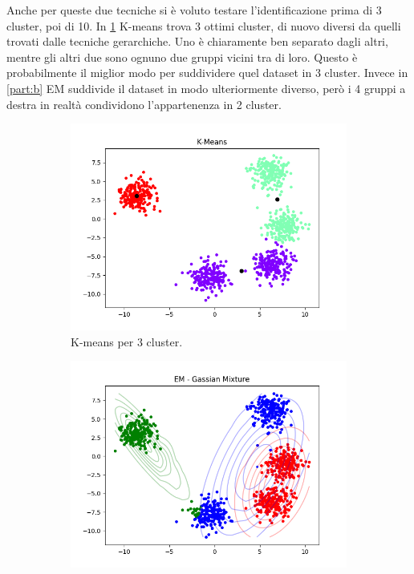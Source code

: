 \documentclass{llncs}
\begin{document}
	Anche per queste due tecniche si è voluto testare l'identificazione prima di 3 cluster, poi di 10. In \ref{part:a} K-means trova 3 ottimi cluster, di nuovo diversi da quelli trovati dalle tecniche gerarchiche.
	Uno è chiaramente ben separato dagli altri, mentre gli altri due sono ognuno due gruppi vicini tra di loro. Questo è probabilmente il miglior modo per suddividere quel dataset in 3 cluster. 
	Invece in \ref{part:b} EM suddivide il dataset in modo ulteriormente diverso, però i 4 gruppi a destra in realtà condividono l'appartenenza in 2 cluster.
	\\
	\begin{figure}[h]
		\begin{subfigure}{.5\textwidth}
		  \centering
		  \includegraphics[width=\linewidth]{immagini/5_clusters_kmeans_3.png}
		  \caption{K-means per 3 cluster.}
		  \label{part:a}
		\end{subfigure}%
		\begin{subfigure}{.5\textwidth}
		  \centering
		  \includegraphics[width=\linewidth]{immagini/5_clusters_gmm_3.png}

\end{subfigure}
\end{figure}
\end{document}
